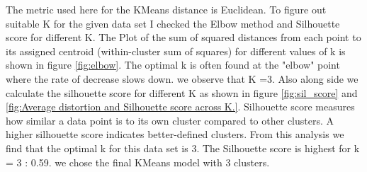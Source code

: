 \documentclass[10pt,a4paper]{style}
\begin{document}
		The metric used here for the KMeans distance is Euclidean. To figure out suitable K for the given data set I checked the Elbow method and Silhouette score for different K. The Plot of the sum of squared distances from each point to its assigned centroid (within-cluster sum of squares) for different values of k is shown in figure \ref{fig:elbow}. The optimal k is often found at the "elbow" point where the rate of decrease slows down. we observe that K =3. Also along side we calculate the silhouette score for different K as shown in figure \ref{fig:sil_score} and \ref{fig:Average distortion and Silhouette score across K.}. Silhouette score measures how similar a data point is to its own cluster compared to other clusters. A higher silhouette score indicates better-defined clusters. From this analysis  we find that the optimal k for this data set is 3. The Silhouette score is highest for k = 3 : 0.59. we chose the final KMeans model with 3 clusters.
\end{document}
